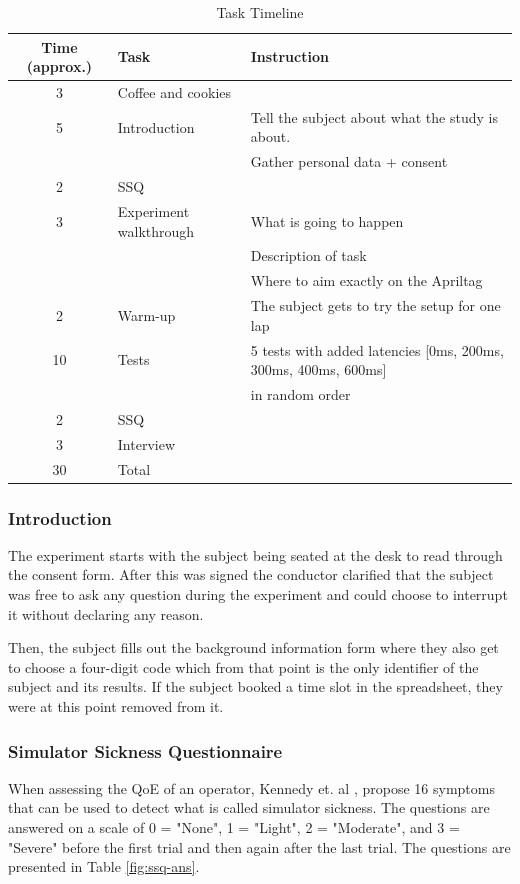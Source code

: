 \documentclass[nofilelist]{cslthse-msc}
\begin{document}
\begin{table}[ht]
   \centering
   \caption{Task Timeline}
   \label{tab:task-timeline}
   \begin{tabular}{|c|l|l|}
   \hline
   \textbf{Time (approx.)} & \textbf{Task} & \textbf{Instruction} \\ \hline
   3 & Coffee and cookies & \\ \hline
   5 & Introduction & Tell the subject about what the study is about. \\
   & & Gather personal data + consent \\ \hline
   2 & SSQ & \\ \hline
   3 & Experiment walkthrough & What is going to happen \\
   & & Description of task \\
   & & Where to aim exactly on the Apriltag \\ \hline
   2 & Warm-up & The subject gets to try the setup for one lap \\ \hline
   10 & Tests & 5 tests with added latencies [0ms, 200ms, 300ms, 400ms, 600ms] \\ 
   & & in random order \\ \hline
   2 & SSQ & \\ \hline
   3 & Interview & \\ \hline
   30 & Total & \\ \hline
   \end{tabular}
\end{table}

\subsubsection{Introduction}
The experiment starts with the subject being seated at the desk to read through the consent form. After this was signed the conductor clarified that the subject was free to ask any question during the experiment and could choose to interrupt it without declaring any reason. 

Then, the subject fills out the background information form where they also get to choose a four-digit code which from that point is the only identifier of the subject and its results. If the subject booked a time slot in the spreadsheet, they were at this point removed from it.

\subsubsection{Simulator Sickness Questionnaire}
When assessing the QoE of an operator, Kennedy et. al \cite{ssq}, propose 16 symptoms that can be used to detect what is called simulator sickness. The questions are answered on a scale of 0 = "None", 1 = "Light", 2 = "Moderate", and 3 = "Severe" before the first trial and then again after the last trial. The questions are presented in Table \ref{fig:ssq-ans}.
\end{document}
